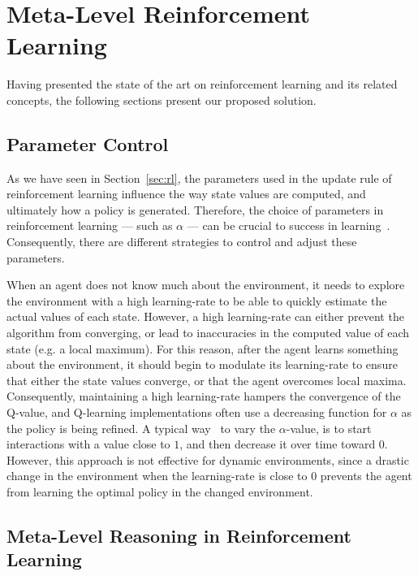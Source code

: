 \chapter{Meta-Level Reinforcement Learning}
\label{chapter:meta-rl}
Having presented the state of the art on reinforcement learning and its related concepts,
the following sections present our proposed solution.


\section{Parameter Control}
\label{sec:parameter-control}

As we have seen in Section~\ref{sec:rl}, the parameters used in the update rule of reinforcement learning influence the way state values are computed, and ultimately how a policy is generated. 
Therefore, the choice of parameters in reinforcement learning
--- such as $\alpha$ ---
can be crucial to success in learning~\cite{schweighofer2003meta}. 
Consequently, there are different strategies to control and adjust these parameters. 

When an agent does not know much about the environment, it needs to explore the environment with a high learning-rate to be able to quickly estimate the actual values of each state. 
However, a high learning-rate can either prevent the algorithm from converging, or lead to inaccuracies in the computed value of each state (e.g. a local maximum). 
For this reason, after the agent learns something about the environment, it should begin to modulate its learning-rate to ensure that either the state values converge, or that the agent overcomes local maxima. 
% 
Consequently, maintaining a high learning-rate hampers the convergence of the Q-value, and Q-learning implementations often use a decreasing function for $\alpha$ as the policy is being refined. 
A typical way~\cite{schweighofer2003meta} to vary the $\alpha$-value, is to start interactions with a value close to $1$, and then decrease it over time toward $0$.
However, this approach is not effective for dynamic environments, since a drastic change in the environment when the learning-rate is close to $0$ prevents the agent from learning the optimal policy in the changed environment. 



\section{Meta-Level Reasoning in Reinforcement Learning}
\label{sec:meta-reasoning-rl}

